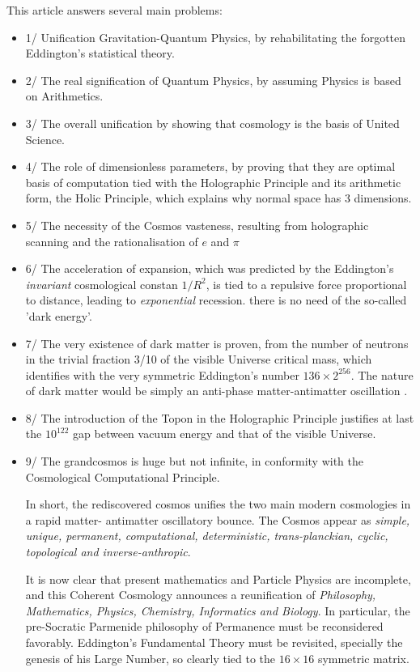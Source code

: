 \documentclass[twoside,draft]{article}
\begin{document}
\begin{sloppypar}
{This article answers several main problems: 
\begin{itemize}
\item 1/ Unification Gravitation-Quantum Physics, by
rehabilitating the forgotten Eddington's statistical theory. 
\item 2/ The real signification of Quantum
Physics, by assuming Physics is based on Arithmetics. 
\item 3/ The overall unification by showing that
cosmology is the basis of United Science. 
\item 4/ The role of dimensionless parameters, by proving that
they are optimal basis of computation tied with the Holographic Principle and its arithmetic form,
the Holic Principle, which explains why normal space has 3 dimensions.
\item 5/ The necessity of the Cosmos vasteness, resulting from holographic scanning and the rationalisation of $e$ and $\pi$
\item 6/ The acceleration of expansion, which was predicted by the Eddington's \textit{invariant} cosmological constan $1/R^2$, is tied to a repulsive force proportional to distance, leading to \textit{exponential} recession. there is no need of the so-called 'dark energy'.
\item 7/ The very existence of dark matter is proven, from the number of neutrons in the trivial fraction 3/10 of the visible Universe critical mass, which identifies with the very symmetric Eddington's number $136 \times 2^{256}$. The nature of dark matter would be simply an anti-phase matter-antimatter oscillation \cite{Sanchez1}.  
\item 8/ The introduction of the Topon in the Holographic Principle justifies at last the $10^{122}$ gap between vacuum energy and that of the visible Universe.
\item 9/ The grandcosmos is huge but not infinite, in conformity with the Cosmological Computational Principle.

In short, the rediscovered cosmos unifies the two main modern cosmologies in a rapid matter-
antimatter oscillatory bounce. The Cosmos appear as \textit{simple, unique, permanent, computational,
deterministic, trans-planckian, cyclic, topological and inverse-anthropic}.

It is now clear that present mathematics and Particle Physics are incomplete, and this Coherent Cosmology announces a reunification of \textit{Philosophy, Mathematics, Physics, Chemistry, Informatics and Biology}. In particular, the pre-Socratic Parmenide philosophy of Permanence must be reconsidered favorably. Eddington's Fundamental Theory must be revisited, specially the genesis of his Large Number, so clearly tied to the $16 \times 16$ symmetric matrix.


\end{itemize}}
\end{sloppypar}
\end{document}

